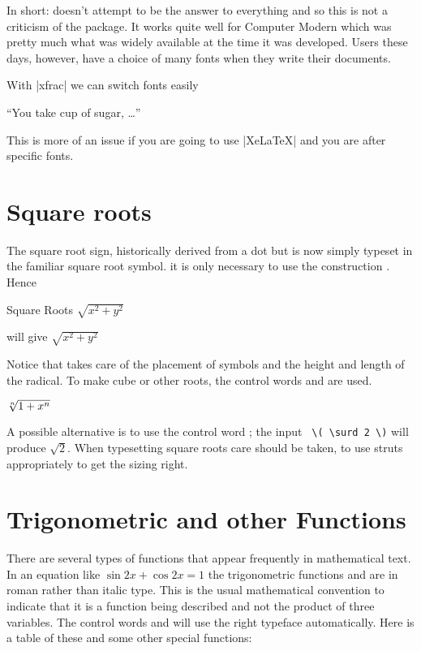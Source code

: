In short:  doesn't attempt to be the answer to
everything and so this is not a criticism of the package. It works
quite well for Computer Modern which was pretty much what was widely
available at the time it was developed. Users these days, however,
have a choice of many fonts when they write their documents.

With |xfrac| we can switch fonts easily

 ``You take  cup of sugar, \ldots''

This is more of an issue if you are going to use |XeLaTeX| and 
you are after specific fonts.


\section{Square roots}

The square root sign, historically derived from a dot but is now simply typeset in the familiar square root symbol.  it is only necessary to use the construction . Hence

\begin{texexample}{Square Roots}{}
$\sqrt{x^2+y^2}$
\end{texexample}

will give $\sqrt{x^2+y^2}$


Notice that \tex takes care of the placement of
symbols and the height and length of the radical. To make cube or other roots, the control
words  and  are used.  

\begin{texexample}{}{}
   $\root n \of  {1+x^n}$ 
\end{texexample}

\begin{macro}{\surd}
 A possible alternative is to use the control word ; the input  \verb+ \( \surd 2 \)+ will
produce \(\surd 2\). When typesetting square roots care should be taken, to use struts appropriately to get the sizing right.
\end{macro}


\section{Trigonometric and other Functions}

There are several types of functions that appear frequently in mathematical text. In
an equation like $\sin2x+\cos2x=1$ the trigonometric functions  and  are in
roman rather than italic type. This is the usual mathematical convention to indicate that
it is a function being described and not the product of three variables. The control words
 and  will use the right typeface automatically. Here is a table of these and some
other special functions:

